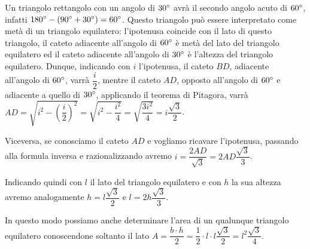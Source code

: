 Un triangolo rettangolo con un angolo di $30{}^{\circ}$ avrà il secondo angolo acuto di $60{}^{\circ}$, infatti $180{}^{\circ}- (90{}^{\circ}+30{}^{\circ})=60{}^{\circ}$. Questo triangolo può essere interpretato come metà di un triangolo equilatero: l'ipotenusa coincide con il lato di questo triangolo, il cateto adiacente all'angolo di $60{}^{\circ}$ è metà del lato del triangolo equilatero ed il cateto adiacente all'angolo di $30{}^{\circ}$ è l'altezza del triangolo equilatero.
Dunque, indicando con $i$ l'ipotenusa, il cateto $BD$, adiacente all'angolo di $60{}^{\circ}$, varrà $\dfrac{i}{2}$, mentre il cateto $AD$, opposto all'angolo di $60{}^{\circ}$ e adiacente a quello di $30{}^{\circ}$, applicando il teorema di Pitagora, varrà $AD=\sqrt{i^2-\left(\dfrac{i}{2}\right)^2}=\sqrt{i^2-\dfrac{i^2}{4}}=\sqrt{\dfrac{3i^2}{4}}=i\dfrac{\sqrt{3}}{2}$.

Viceversa, se conosciamo il cateto $AD$ e vogliamo ricavare l'ipotenusa, passando alla formula inversa e razionalizzando avremo $i=\dfrac{2AD}{\sqrt{3}}=2AD\dfrac{\sqrt{3}}{3}$.

Indicando quindi con $l$ il lato del triangolo equilatero e con $h$ la sua altezza avremo analogamente $h=l\dfrac{\sqrt{3}}{2}$ e $l=2h\dfrac{\sqrt{3}}{3}$.

In questo modo possiamo anche determinare l'area di un qualunque triangolo equilatero conoscendone soltanto il lato $A=\dfrac{b\cdot h}{2}=\dfrac{1}{2}\cdot l\cdot l\dfrac{\sqrt{3}}{2}=l^2\dfrac{\sqrt{3}}{4}$.

